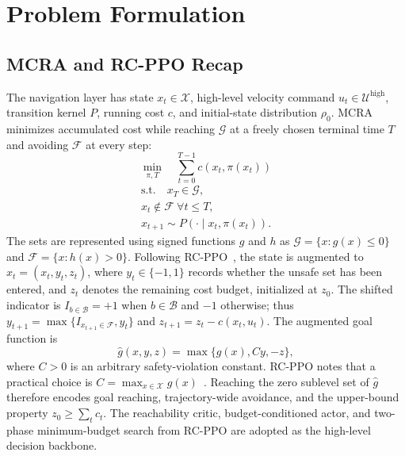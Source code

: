 \documentclass[conference]{IEEEtran}
\begin{document}
\section{Problem Formulation}
\label{sec:problem_setup}
\subsection{MCRA and RC-PPO Recap}
The navigation layer has state $x_t\in
\mathcal{X}$, high-level velocity command $u_t\in\mathcal{U}^{\mathrm{high}}$,
transition kernel $P$, running cost $c$, and initial-state distribution $\rho_0$.
MCRA minimizes accumulated cost while reaching $\mathcal{G}$ at a freely chosen
terminal time $T$ and avoiding $\mathcal{F}$ at every step:
\begin{equation}
\min_{\pi,T}\quad \sum_{t=0}^{T-1}c(x_t,\pi(x_t))
\label{eq:mcra_objective}
\end{equation}
\begin{equation}
\begin{gathered}
\mathrm{s.t.}\quad x_T\in\mathcal{G},\\
x_t\notin\mathcal{F}\ \forall t\leq T,\\
x_{t+1}\sim P(\cdot\mid x_t,\pi(x_t)).
\end{gathered}
\label{eq:mcra_constraints}
\end{equation}
The sets are represented using signed functions $g$ and $h$ as
$\mathcal{G}=\{x:g(x)\leq0\}$ and $\mathcal{F}=\{x:h(x)>0\}$. Following
RC-PPO~\cite{so2024}, the state is augmented to $\hat{x}_t=(x_t,y_t,z_t)$,
where $y_t\in\{-1,1\}$ records whether the unsafe set has been entered, and $z_t$
denotes the remaining cost budget, initialized at $z_0$. The shifted indicator is
$I_{b\in\mathcal{B}}=+1$ when $b\in\mathcal{B}$ and $-1$ otherwise; thus
$y_{t+1}=\max\{I_{x_{t+1}\in\mathcal{F}},y_t\}$ and
$z_{t+1}=z_t-c(x_t,u_t)$. The augmented goal function is
\begin{equation}
\hat{g}(x,y,z)=\max\{g(x),Cy,-z\},
\label{eq:augmented_goal}
\end{equation}
where $C>0$ is an arbitrary safety-violation constant. RC-PPO notes that a
practical choice is $C=\max_{x\in\mathcal{X}}g(x)$~\cite{so2024}. Reaching the
zero sublevel set of $\hat{g}$ therefore encodes goal reaching, trajectory-wide
avoidance, and the upper-bound property $z_0\geq\sum_t c_t$. The reachability critic,
budget-conditioned actor, and two-phase minimum-budget search from RC-PPO are
adopted as the high-level decision backbone.
\end{document}
